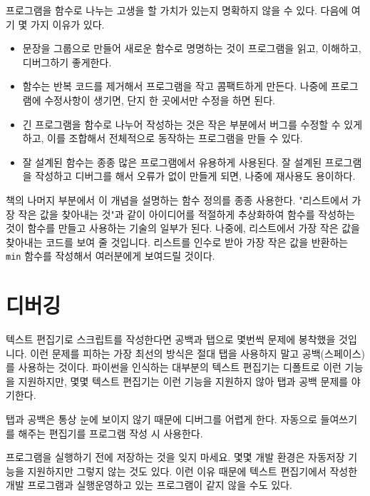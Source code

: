 프로그램을 함수로 나누는 고생을 할 가치가 있는지 명확하지 않을 수 있다. 다음에 여기 몇 가지 이유가 있다.

\begin{itemize}

\item 문장을 그룹으로 만들어 새로운 함수로 명명하는 것이 프로그램을 읽고, 이해하고, 디버그하기 좋게한다. 

\item 함수는 반복 코드를 제거해서 프로그램을 작고 콤팩트하게 만든다. 나중에 프로그램에 수정사항이 생기면, 단지 한 곳에서만 수정을 하면 된다.

\item 긴 프로그램을 함수로 나누어 작성하는 것은 작은 부분에서 버그를 수정할 수 있게 하고, 이를 조합해서 전체적으로 동작하는 프로그램을 만들 수 있다.

\item 잘 설계된 함수는 종종 많은 프로그램에서 유용하게 사용된다. 잘 설계된 프로그램을 작성하고 디버그를 해서 오류가 없이 만들게 되면, 나중에 재사용도 용이하다.

\end{itemize}

책의 나머지 부분에서 이 개념을 설명하는 함수 정의를 종종 사용한다. 
"리스트에서 가장 작은 값을 찾아내는 것"과 같이 아이디어를 적절하게 추상화하여 함수를 작성하는 것이 함수를 만들고 사용하는 기술의 일부가 된다. 
나중에, 리스트에서 가장 작은 값을 찾아내는 코드를 보여 줄 것입니다. 리스트를 인수로 받아 가장 작은 값을 
반환하는 {\tt min} 함수를 작성해서 여러분에게 보여드릴 것이다.

\section{디버깅}
\label{editor}

텍스트 편집기로 스크립트를 작성한다면 공백과 탭으로 몇번씩 문제에 봉착했을 것입니다. 
이런 문제를 피하는 가장 최선의 방식은 절대 탭을 사용하지 말고 공백(스페이스)를 사용하는 것이다. 
파이썬을 인식하는 대부분의 텍스트 편집기는 디폴트로 이런 기능을 지원하지만, 몇몇 텍스트 편집기는 이런 기능을 지원하지 않아 탭과 공백 문제를 야기한다.


탭과 공백은 통상 눈에 보이지 않기 때문에 디버그를 어렵게 한다. 
자동으로 들여쓰기를 해주는 편집기를 프로그램 작성 시 사용한다.

프로그램을 실행하기 전에 저장하는 것을 잊지 마세요. 
몇몇 개발 환경은 자동저장 기능을 지원하지만 그렇지 않는 것도 있다.
이런 이유 때문에 텍스트 편집기에서 작성한 개발 프로그램과 실행운영하고 있는 프로그램이 같지 않을 수도 있다.

